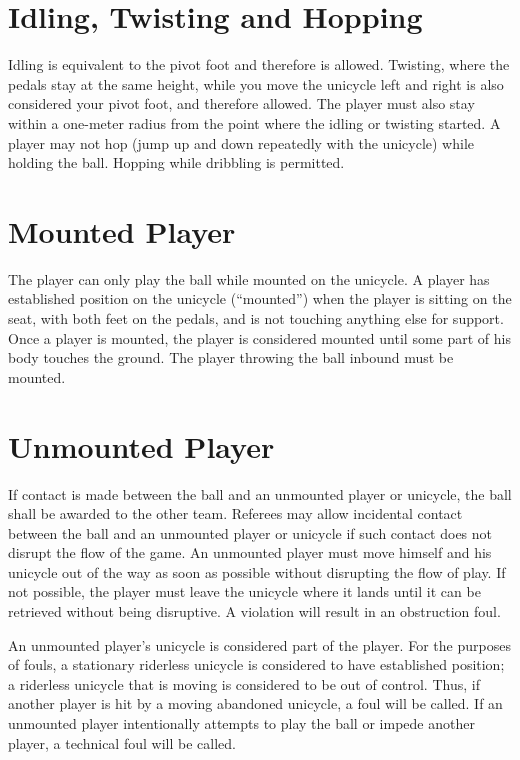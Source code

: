 \section{Idling, Twisting and Hopping}
Idling is equivalent to the pivot foot and therefore is allowed.
Twisting, where the pedals stay at the same height, while you move the unicycle left and right is also considered your pivot foot, and therefore allowed.
The player must also stay within a one-meter radius from the point where the idling or twisting started.
A player may not hop (jump up and down repeatedly with the unicycle) while holding the ball.
Hopping while dribbling is permitted.

\section{Mounted Player}
The player can only play the ball while mounted on the unicycle.
A player has established position on the unicycle (``mounted'') when the player is sitting on the seat, with both feet on the pedals, and is not touching anything else for support.
Once a player is mounted, the player is considered mounted until some part of his body touches the ground.
The player throwing the ball inbound must be mounted.

\section{Unmounted Player}
If contact is made between the ball and an unmounted player or unicycle, the ball shall be awarded to the other team.
Referees may allow incidental contact between the ball and an unmounted player or unicycle if such contact does not disrupt the flow of the game.
An unmounted player must move himself and his unicycle out of the way as soon as possible
without disrupting the flow of play.
If not possible, the player must leave the unicycle where it lands until it can be retrieved without being disruptive.
A violation will result in an obstruction foul.

An unmounted player's unicycle is considered part of the player.
For the purposes of fouls, a stationary riderless unicycle is considered to have established position; a riderless unicycle that is moving is considered to be out of control.
Thus, if another player is hit by a moving abandoned unicycle, a foul will be called.
If an unmounted player intentionally attempts to play the ball or impede another player, a technical foul will be called.

